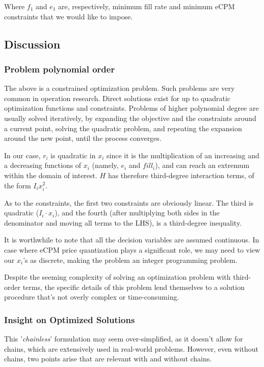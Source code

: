 \documentclass{article}
\begin{document}
\begin{large}
Where $f_1$ and $e_1$ are, respectively, minimum fill rate and minimum eCPM constraints that we would like to impose.

\subsection{Discussion}
\subsubsection{Problem polynomial order}
The above is a constrained optimization problem. Such problems are very common in operation research. Direct solutions exist for up to quadratic optimization functions and constraints. Problems of higher polynomial degree are usually solved iteratively, by expanding the objective and the constraints around a current point, solving the quadratic problem, and repeating the expansion around the new point, until the process converges.

In our case, $r_i$ is quadratic in $x_i$ since it is the multiplication of an increasing and a decreasing functions of $x_i$ (namely, $e_i$ and $fill_i$), and can reach an extremum within the domain of interest. $H$ has therefore third-degree interaction terms, of the form $I_i x^2_i$. 

As to the constraints, the first two constraints are obviously linear. The third is quadratic ($I_i \cdot x_i$), and the fourth (after multiplying both sides in the denominator and moving all terms to the LHS), is a third-degree inequality.

It is worthwhile to note that all the decision variables are assumed continuous. In case where eCPM price quantization plays a significant role, we may need to view our $x_i$'s as discrete, making the problem an integer programming problem.

Despite the seeming complexity of solving an optimization problem with third-order terms, the specific details of this problem lend themselves to a solution procedure that's not overly complex or time-consuming.

\subsubsection{Insight on Optimized Solutions}
This '\emph{chainless}' formulation may seem over-simplified, as it doesn't allow for  chains, which are extensively used in real-world problems. However, even without chains, two points arise that are relevant with and without chains. 


\end{large}
\end{document}

